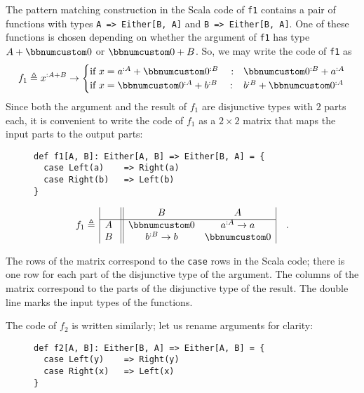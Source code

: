 The pattern matching construction in the Scala code of \lstinline!f1!
contains a pair of functions with types \lstinline!A => Either[B, A]!
and \lstinline!B => Either[B, A]!. One of these functions is chosen
depending on whether the argument of \lstinline!f1! has type $A+\bbnum 0$
or $\bbnum 0+B$. So, we may write the code of \lstinline!f1! as
\[
f_{1}\triangleq x^{:A+B}\rightarrow\begin{cases}
\text{if }x=a^{:A}+\bbnum 0^{:B}\quad: & \bbnum 0^{:B}+a^{:A}\\
\text{if }x=\bbnum 0^{:A}+b^{:B}\quad: & b^{:B}+\bbnum 0^{:A}
\end{cases}
\]
Since both the argument and the result of $f_{1}$ are disjunctive
types with $2$ parts each, it is convenient to write the code of
$f_{1}$ as a $2\times2$ matrix that maps the input parts to the
output parts:\begin{wrapfigure}{l}{0.5\columnwidth}%
\vspace{-0.5\baselineskip}
\begin{lstlisting}
def f1[A, B]: Either[A, B] => Either[B, A] = {
  case Left(a)    => Right(a)
  case Right(b)   => Left(b)
}
\end{lstlisting}
\vspace{-2\baselineskip}
\end{wrapfigure}%
\vspace{-0.6\baselineskip}
\[
f_{1}\triangleq\,\begin{array}{|c||cc|}
 & B & A\\
\hline A~ & \bbnum 0 & a^{:A}\rightarrow a\\
B~ & b^{:B}\rightarrow b & \bbnum 0
\end{array}\quad.
\]
\vspace{-0.5\baselineskip}

The rows of the matrix correspond to the \lstinline!case! rows in
the Scala code; there is one row for each part of the disjunctive
type of the argument. The columns of the matrix correspond to the
parts of the disjunctive type of the result.
The double line marks the input types of the functions.

The code of $f_{2}$ is written similarly; let us rename arguments
for clarity:\hfill{}~\begin{wrapfigure}[4]{l}{0.5\columnwidth}%
\vspace{-0.7\baselineskip}
\begin{lstlisting}
def f2[A, B]: Either[B, A] => Either[A, B] = {
  case Left(y)    => Right(y)
  case Right(x)   => Left(x)
}
\end{lstlisting}
\vspace{-1.5\baselineskip}
\end{wrapfigure}%

